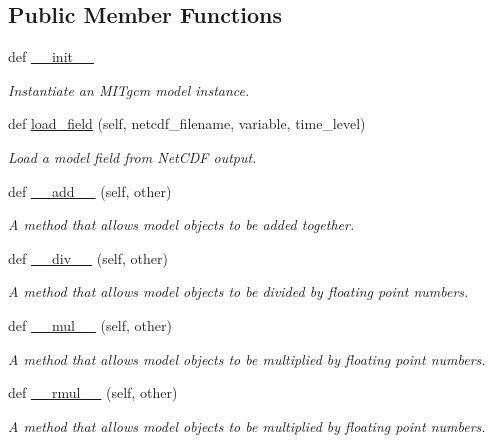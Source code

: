 \subsection*{Public Member Functions}
\begin{DoxyCompactItemize}
\item 
def \hyperlink{classmitgcm_1_1core_1_1MITgcm__Simulation_aac012c75a0f5dce8bbc4b00422a12444}{\+\_\+\+\_\+init\+\_\+\+\_\+}
\begin{DoxyCompactList}\small\item\em Instantiate an M\+I\+Tgcm model instance. \end{DoxyCompactList}\item 
def \hyperlink{classmitgcm_1_1core_1_1MITgcm__Simulation_ac527880ea1c29ee3099bc9d5c71beff1}{load\+\_\+field} (self, netcdf\+\_\+filename, variable, time\+\_\+level)
\begin{DoxyCompactList}\small\item\em Load a model field from Net\+C\+D\+F output. \end{DoxyCompactList}\item 
def \hyperlink{classmitgcm_1_1core_1_1MITgcm__Simulation_ad87c2a60ef71c33a8a8bcbb7b7f8564b}{\+\_\+\+\_\+add\+\_\+\+\_\+} (self, other)
\begin{DoxyCompactList}\small\item\em A method that allows model objects to be added together. \end{DoxyCompactList}\item 
def \hyperlink{classmitgcm_1_1core_1_1MITgcm__Simulation_a2a8e8df1221028288883837cbf027bdb}{\+\_\+\+\_\+div\+\_\+\+\_\+} (self, other)
\begin{DoxyCompactList}\small\item\em A method that allows model objects to be divided by floating point numbers. \end{DoxyCompactList}\item 
def \hyperlink{classmitgcm_1_1core_1_1MITgcm__Simulation_aa18b056e051289d148f1493f1aa75b55}{\+\_\+\+\_\+mul\+\_\+\+\_\+} (self, other)
\begin{DoxyCompactList}\small\item\em A method that allows model objects to be multiplied by floating point numbers. \end{DoxyCompactList}\item 
def \hyperlink{classmitgcm_1_1core_1_1MITgcm__Simulation_a029086ad72acb8cb8c12e9d02e0092aa}{\+\_\+\+\_\+rmul\+\_\+\+\_\+} (self, other)
\begin{DoxyCompactList}\small\item\em A method that allows model objects to be multiplied by floating point numbers. \end{DoxyCompactList}\end{DoxyCompactItemize}
